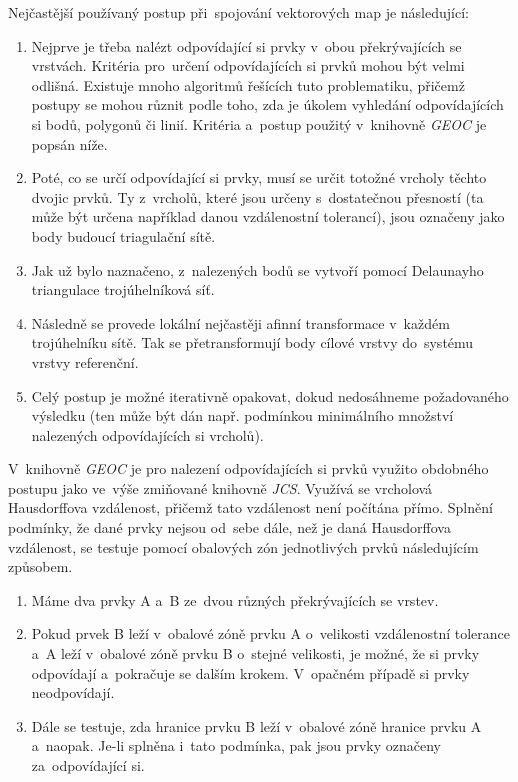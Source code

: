 Nejčastější používaný postup při~spojování vektorových map je následující:

\begin{enumerate}
 \item Nejprve je třeba nalézt odpovídající si prvky v~obou překrývajících se vrstvách. Kritéria pro~určení odpovídajících si prvků mohou být velmi odlišná. Existuje mnoho
	algoritmů řešících tuto problematiku, přičemž postupy se mohou různit podle toho, zda je úkolem vyhledání odpovídajících si bodů, polygonů či linií. Kritéria a~postup
	použitý v~knihovně \textit{GEOC} je popsán níže.
 \item Poté, co se určí odpovídající si prvky, musí se určit totožné vrcholy těchto dvojic prvků. Ty z~vrcholů, které jsou určeny s~dostatečnou přesností (ta může být určena
	například danou vzdálenostní tolerancí), jsou označeny jako body budoucí triagulační sítě.
 \item Jak už bylo naznačeno, z~nalezených bodů se vytvoří pomocí Delaunayho triangulace trojúhelníková síť.
 \item Následně se provede lokální nejčastěji afinní transformace v~každém trojúhelníku sítě. Tak se přetransformují body cílové vrstvy do~systému vrstvy referenční.
 \item Celý postup je možné iterativně opakovat, dokud nedosáhneme požadovaného výsledku (ten může být dán např. podmínkou minimálního množství nalezených 
	odpovídajících si vrcholů).
\end{enumerate}

V~knihovně \textit{GEOC} je pro nalezení odpovídajících si prvků využito obdobného postupu jako ve~výše zmiňované knihovně \textit{JCS}. Využívá se vrcholová Hausdorffova 
vzdálenost, přičemž tato vzdálenost není počítána přímo. Splnění podmínky, že dané prvky nejsou od~sebe dále, než je daná Hausdorffova vzdálenost, se testuje pomocí obalových
zón jednotlivých prvků následujícím způsobem.

\begin{enumerate}
 \item Máme dva prvky A a~B ze~dvou různých překrývajících se vrstev.
 \item Pokud prvek B leží v~obalové zóně prvku A o~velikosti vzdálenostní tolerance a~A leží v~obalové zóně prvku B o~stejné velikosti, je možné, že si prvky odpovídají 
	a~pokračuje se dalším krokem. V~opačném případě si prvky neodpovídají.
 \item Dále se testuje, zda hranice prvku B leží v~obalové zóně hranice prvku A a~naopak. Je-li splněna i~tato podmínka, pak jsou prvky označeny za~odpovídající si.
\end{enumerate}




